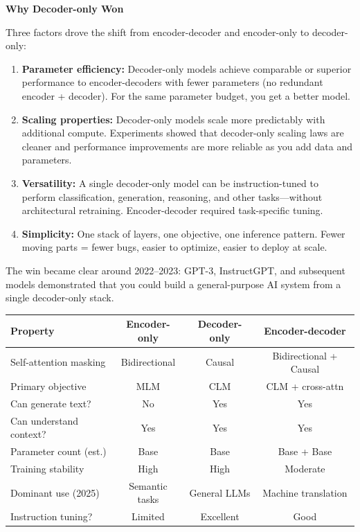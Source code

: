 \begin{warnbox}
\textbf{Why Decoder-only Won}

Three factors drove the shift from encoder-decoder and encoder-only to decoder-only:

\begin{enumerate}
  \item \textbf{Parameter efficiency:} Decoder-only models achieve comparable or superior performance to encoder-decoders with fewer parameters (no redundant encoder + decoder). For the same parameter budget, you get a better model.

  \item \textbf{Scaling properties:} Decoder-only models scale more predictably with additional compute. Experiments showed that decoder-only scaling laws are cleaner and performance improvements are more reliable as you add data and parameters.

  \item \textbf{Versatility:} A single decoder-only model can be instruction-tuned to perform classification, generation, reasoning, and other tasks—without architectural retraining. Encoder-decoder required task-specific tuning.

  \item \textbf{Simplicity:} One stack of layers, one objective, one inference pattern. Fewer moving parts = fewer bugs, easier to optimize, easier to deploy at scale.
\end{enumerate}

The win became clear around 2022–2023: GPT-3, InstructGPT, and subsequent models demonstrated that you could build a general-purpose AI system from a single decoder-only stack.
\end{warnbox}

\begin{paperbox}[title={Comparison: Encoder, Decoder, and Encoder-Decoder}]
\begin{center}
\small
\begin{tabular}{|l|c|c|c|}
\hline
\textbf{Property} & \textbf{Encoder-only} & \textbf{Decoder-only} & \textbf{Encoder-decoder} \\
\hline
Self-attention masking & Bidirectional & Causal & Bidirectional + Causal \\
\hline
Primary objective & MLM & CLM & CLM + cross-attn \\
\hline
Can generate text? & No & Yes & Yes \\
\hline
Can understand context? & Yes & Yes & Yes \\
\hline
Parameter count (est.) & Base & Base & Base + Base \\
\hline
Training stability & High & High & Moderate \\
\hline
Dominant use (2025) & Semantic tasks & General LLMs & Machine translation \\
\hline
Instruction tuning? & Limited & Excellent & Good \\
\hline
\end{tabular}
\end{center}
\end{paperbox}

